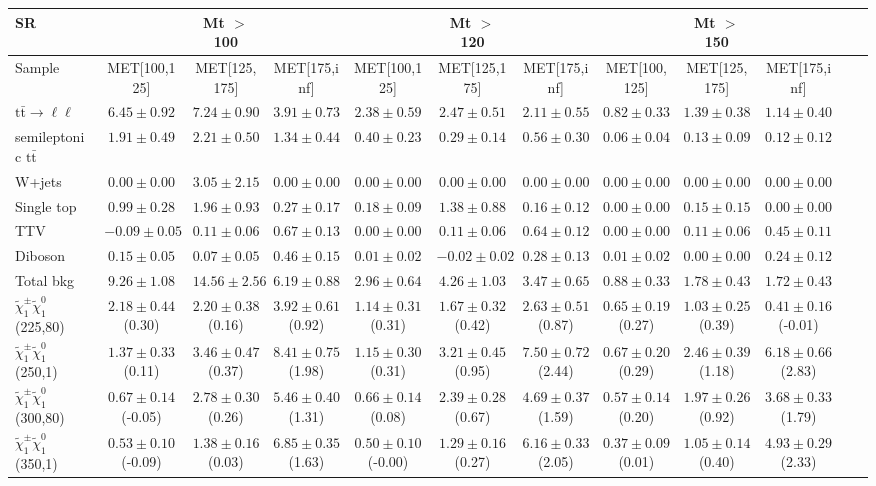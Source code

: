 \begin{table}
\begin{center}
\small
\begin{tabular}{lccccccccccc}
\hline
SR & & Mt $>$ 100 & & & Mt $>$ 120 & & &Mt $>$ 150 & & &\\
\hline
Sample&MET[100,125]&MET[125,175]&MET[175,inf]&MET[100,125]&MET[125,175]&MET[175,inf]&MET[100,125]&MET[125,175]&MET[175,inf]&\\
\hline
$\mathrm{t}\bar{\mathrm{t}}\rightarrow \ell\ell$&$6.45\pm0.92$&$7.24\pm0.90$&$3.91\pm0.73$&$2.38\pm0.59$&$2.47\pm0.51$&$2.11\pm0.55$&$0.82\pm0.33$&$1.39\pm0.38$&$1.14\pm0.40$\\
semileptonic $\mathrm{t}\bar{\mathrm{t}}$&$1.91\pm0.49$&$2.21\pm0.50$&$1.34\pm0.44$&$0.40\pm0.23$&$0.29\pm0.14$&$0.56\pm0.30$&$0.06\pm0.04$&$0.13\pm0.09$&$0.12\pm0.12$\\
W+jets&$0.00\pm0.00$&$3.05\pm2.15$&$0.00\pm0.00$&$0.00\pm0.00$&$0.00\pm0.00$&$0.00\pm0.00$&$0.00\pm0.00$&$0.00\pm0.00$&$0.00\pm0.00$\\
Single top&$0.99\pm0.28$&$1.96\pm0.93$&$0.27\pm0.17$&$0.18\pm0.09$&$1.38\pm0.88$&$0.16\pm0.12$&$0.00\pm0.00$&$0.15\pm0.15$&$0.00\pm0.00$\\
TTV&$-0.09\pm0.05$&$0.11\pm0.06$&$0.67\pm0.13$&$0.00\pm0.00$&$0.11\pm0.06$&$0.64\pm0.12$&$0.00\pm0.00$&$0.11\pm0.06$&$0.45\pm0.11$\\
Diboson&$0.15\pm0.05$&$0.07\pm0.05$&$0.46\pm0.15$&$0.01\pm0.02$&$-0.02\pm0.02$&$0.28\pm0.13$&$0.01\pm0.02$&$0.00\pm0.00$&$0.24\pm0.12$\\
\hline
Total bkg&$9.26\pm1.08$&$14.56\pm2.56$&$6.19\pm0.88$&$2.96\pm0.64$&$4.26\pm1.03$&$3.47\pm0.65$&$0.88\pm0.33$&$1.78\pm0.43$&$1.72\pm0.43$\\
$\tilde{\chi}_{1}^{\pm}\tilde{\chi}_{1}^{0}$ (225,80)&$2.18\pm0.44$(0.30)&$2.20\pm0.38$(0.16)&$3.92\pm0.61$(0.92)&$1.14\pm0.31$(0.31)&$1.67\pm0.32$(0.42)&$2.63\pm0.51$(0.87)&$0.65\pm0.19$(0.27)&$1.03\pm0.25$(0.39)&$0.41\pm0.16$(-0.01)\\
$\tilde{\chi}_{1}^{\pm}\tilde{\chi}_{1}^{0}$ (250,1)&$1.37\pm0.33$(0.11)&$3.46\pm0.47$(0.37)&$8.41\pm0.75$(1.98)&$1.15\pm0.30$(0.31)&$3.21\pm0.45$(0.95)&$7.50\pm0.72$(2.44)&$0.67\pm0.20$(0.29)&$2.46\pm0.39$(1.18)&$6.18\pm0.66$(2.83)\\
$\tilde{\chi}_{1}^{\pm}\tilde{\chi}_{1}^{0}$ (300,80)&$0.67\pm0.14$(-0.05)&$2.78\pm0.30$(0.26)&$5.46\pm0.40$(1.31)&$0.66\pm0.14$(0.08)&$2.39\pm0.28$(0.67)&$4.69\pm0.37$(1.59)&$0.57\pm0.14$(0.20)&$1.97\pm0.26$(0.92)&$3.68\pm0.33$(1.79)\\
$\tilde{\chi}_{1}^{\pm}\tilde{\chi}_{1}^{0}$ (350,1)&$0.53\pm0.10$(-0.09)&$1.38\pm0.16$(0.03)&$6.85\pm0.35$(1.63)&$0.50\pm0.10$(-0.00)&$1.29\pm0.16$(0.27)&$6.16\pm0.33$(2.05)&$0.37\pm0.09$(0.01)&$1.05\pm0.14$(0.40)&$4.93\pm0.29$(2.33)\\
\hline
\hline\hline
\end{tabular}
\end{center}
\end{table}
